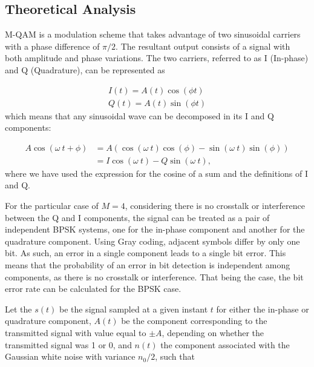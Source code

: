 
\subsection{Theoretical Analysis}

M-QAM is a modulation scheme that takes advantage of two sinusoidal carriers with a phase difference of $\pi/2$. The resultant output consists of a signal with both amplitude and phase variations. The two carriers, referred to as I (In-phase) and Q (Quadrature), can be represented as

\begin{align}
	I(t)=A(t)\cos(\phi t) \\
	Q(t)=A(t)\sin(\phi t)
\end{align}
which means that any sinusoidal wave can be decomposed in its I and Q components:

\begin{align}
	A\cos(\omega~t+\phi)&=A\left(\cos(\omega~t)\cos(\phi)-\sin(\omega~t)\sin(\phi)\right) \\
	&=I\cos(\omega~t)-Q\sin(\omega~t),
\end{align}
where we have used the expression for the cosine of a sum and the definitions of I and Q.



For the particular case of $M=4$, considering there is no crosstalk or interference between the Q and I components, the signal can be treated as a pair of independent BPSK systems, one for the in-phase component and another for the quadrature component.
Using Gray coding, adjacent symbols differ by only one bit. As such, an error in a single component leads to a single bit error.
This means that the probability of an error in bit detection is independent among components, as there is no crosstalk or interference. That being the case, the bit error rate can be calculated for the BPSK case.


Let the $s(t)$ be the signal sampled at a given instant $t$ for either the in-phase or quadrature component, $A(t)$ be the component corresponding to the transmitted signal with value equal to $\pm A$, depending on whether the transmitted signal was 1 or 0, and $n(t)$ the component associated with the Gaussian white noise with variance $n_0/2$, such that

